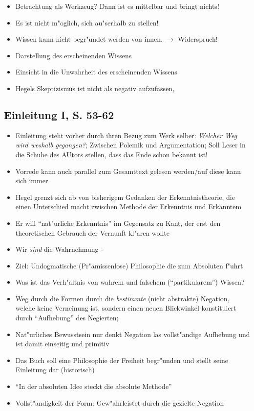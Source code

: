 \documentclass[emulatestandardclasses]{scrartcl}
\begin{document}
\begin{itemize}
  \item Betrachtung als Werkzeug? Dann ist es mittelbar und bringt nichts!
  \item Es ist nicht m"oglich, sich au"serhalb zu stellen!
  \item Wissen kann nicht begr"undet werden von innen. $\rightarrow$ Widerspruch!
  \item Darstellung des erscheinenden Wissens
  \item Einsicht in die Unwahrheit des erscheinenden Wissens
  \item Hegels Skeptizismus ist nicht als negativ aufzufassen, 
\end{itemize}

\subsection{Einleitung I, S. 53-62}

\begin{itemize}
  \item Einleitung steht vorher durch ihren Bezug zum Werk selber: \emph{Welcher Weg wird weshalb gegangen?}; Zwischen Polemik und Argumentation; Soll Leser in die Schuhe des AUtors stellen, dass das Ende schon bekannt ist!
  \item Vorrede kann auch parallel zum Gesamttext gelesen werden/auf diese kann sich immer
  \item Hegel grenzt sich ab von bisherigem Gedanken der Erkenntnistheorie, die einen Unterschied macht zwischen Methode der Erkenntnis und Erkanntem
  \item Er will "`nat"urliche Erkenntnis"' im Gegensatz zu Kant, der erst den theoretischen Gebrauch der Vernunft kl"aren wollte
  \item Wir \emph{sind} die Wahrnehmung - 
  \item Ziel: Undogmatische (Pr"amissenlose) Philosophie die zum Absoluten f"uhrt
  \item Was ist das Verh"altnis von wahrem und falschem ("`partikularem"') Wissen?
  \item Weg durch die Formen durch die \emph{bestimmte} (nicht abstrakte) Negation, welche keine Verneinung ist, sondern einen neuen Blickwinkel konstituiert durch "`Aufhebung"' des Negierten; 
  \item Nat"urliches Bewusstsein nur denkt Negation las vollst"andige Aufhebung und ist damit einseitig und primitiv
  \item Das Buch soll eine Philosophie der Freiheit begr"unden und stellt seine Einleitung dar (historisch)
  \item "`In der absoluten Idee steckt die absolute Methode"'
  \item Vollst"andigkeit der Form: Gew"ahrleistet durch die gezielte Negation
\end{itemize}
\end{document}
